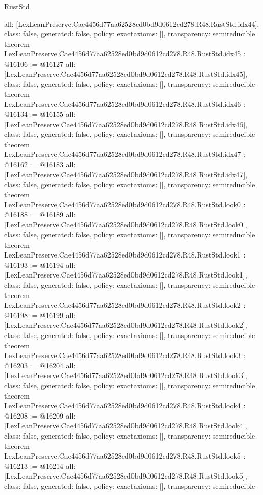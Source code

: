 \begin{lexlean}{RustStd}
\begin{coremodule}
{  all: [LexLeanPreserve.Cae4456d77aa62528ed0bd9d0612cd278.R48.RustStd.idx44],
  class: false,
  generated: false,
  policy: exact{axioms: []},
  transparency: semireducible
}
theorem LexLeanPreserve.Cae4456d77aa62528ed0bd9d0612cd278.R48.RustStd.idx45 : @16106 := @16127 {
  all: [LexLeanPreserve.Cae4456d77aa62528ed0bd9d0612cd278.R48.RustStd.idx45],
  class: false,
  generated: false,
  policy: exact{axioms: []},
  transparency: semireducible
}
theorem LexLeanPreserve.Cae4456d77aa62528ed0bd9d0612cd278.R48.RustStd.idx46 : @16134 := @16155 {
  all: [LexLeanPreserve.Cae4456d77aa62528ed0bd9d0612cd278.R48.RustStd.idx46],
  class: false,
  generated: false,
  policy: exact{axioms: []},
  transparency: semireducible
}
theorem LexLeanPreserve.Cae4456d77aa62528ed0bd9d0612cd278.R48.RustStd.idx47 : @16162 := @16183 {
  all: [LexLeanPreserve.Cae4456d77aa62528ed0bd9d0612cd278.R48.RustStd.idx47],
  class: false,
  generated: false,
  policy: exact{axioms: []},
  transparency: semireducible
}
theorem LexLeanPreserve.Cae4456d77aa62528ed0bd9d0612cd278.R48.RustStd.look0 : @16188 := @16189 {
  all: [LexLeanPreserve.Cae4456d77aa62528ed0bd9d0612cd278.R48.RustStd.look0],
  class: false,
  generated: false,
  policy: exact{axioms: []},
  transparency: semireducible
}
theorem LexLeanPreserve.Cae4456d77aa62528ed0bd9d0612cd278.R48.RustStd.look1 : @16193 := @16194 {
  all: [LexLeanPreserve.Cae4456d77aa62528ed0bd9d0612cd278.R48.RustStd.look1],
  class: false,
  generated: false,
  policy: exact{axioms: []},
  transparency: semireducible
}
theorem LexLeanPreserve.Cae4456d77aa62528ed0bd9d0612cd278.R48.RustStd.look2 : @16198 := @16199 {
  all: [LexLeanPreserve.Cae4456d77aa62528ed0bd9d0612cd278.R48.RustStd.look2],
  class: false,
  generated: false,
  policy: exact{axioms: []},
  transparency: semireducible
}
theorem LexLeanPreserve.Cae4456d77aa62528ed0bd9d0612cd278.R48.RustStd.look3 : @16203 := @16204 {
  all: [LexLeanPreserve.Cae4456d77aa62528ed0bd9d0612cd278.R48.RustStd.look3],
  class: false,
  generated: false,
  policy: exact{axioms: []},
  transparency: semireducible
}
theorem LexLeanPreserve.Cae4456d77aa62528ed0bd9d0612cd278.R48.RustStd.look4 : @16208 := @16209 {
  all: [LexLeanPreserve.Cae4456d77aa62528ed0bd9d0612cd278.R48.RustStd.look4],
  class: false,
  generated: false,
  policy: exact{axioms: []},
  transparency: semireducible
}
theorem LexLeanPreserve.Cae4456d77aa62528ed0bd9d0612cd278.R48.RustStd.look5 : @16213 := @16214 {
  all: [LexLeanPreserve.Cae4456d77aa62528ed0bd9d0612cd278.R48.RustStd.look5],
  class: false,
  generated: false,
  policy: exact{axioms: []},
  transparency: semireducible
}
\end{coremodule}
\end{lexlean}
